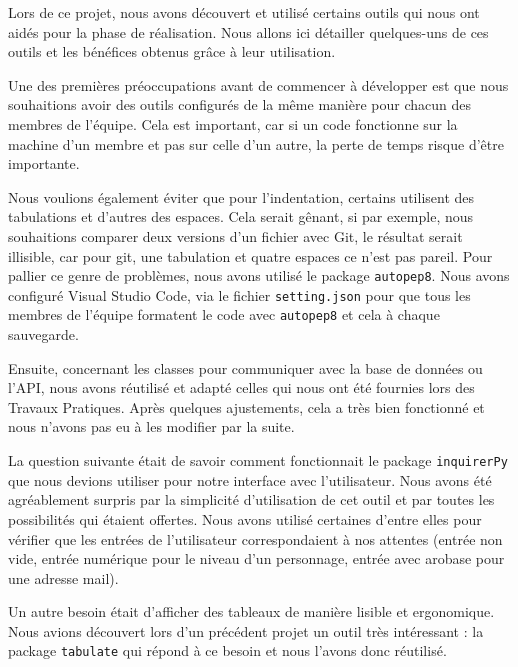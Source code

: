 \documentclass[11pt]{article}
\begin{document}
Lors de ce projet, nous avons découvert et utilisé certains outils qui nous ont aidés pour la phase de réalisation. Nous allons ici détailler quelques-uns de ces outils et les bénéfices obtenus grâce à leur utilisation.

\bigbreak

Une des premières préoccupations avant de commencer à développer est que nous souhaitions avoir des outils configurés de la même manière pour chacun des membres de l'équipe. Cela est important, car si un code fonctionne sur la machine d'un membre et pas sur celle d'un autre, la perte de temps risque d'être importante.


\bigbreak

Nous voulions également éviter que pour l'indentation, certains utilisent des tabulations et d'autres des espaces. Cela serait gênant, si par exemple, nous souhaitions comparer deux versions d'un fichier avec Git, le résultat serait illisible, car pour git, une tabulation et quatre espaces ce n'est pas pareil. Pour pallier ce genre de problèmes, nous avons utilisé le package \texttt{autopep8}. Nous avons configuré Visual Studio Code, via le fichier \texttt{setting.json} pour que tous les membres de l'équipe formatent le code avec \texttt{autopep8} et cela à chaque sauvegarde.

\bigbreak

Ensuite, concernant les classes pour communiquer avec la base de données ou l'API, nous avons réutilisé et adapté celles qui nous ont été fournies lors des Travaux Pratiques. Après quelques ajustements, cela a très bien fonctionné et nous n'avons pas eu à les modifier par la suite.

\bigbreak

La question suivante était de savoir comment fonctionnait le package \texttt{inquirerPy} que nous devions utiliser pour notre interface avec l'utilisateur. Nous avons été agréablement surpris par la simplicité d'utilisation de cet outil et par toutes les possibilités qui étaient offertes. Nous avons utilisé certaines d'entre elles pour vérifier que les entrées de l'utilisateur correspondaient à nos attentes (entrée non vide, entrée numérique pour le niveau d'un personnage, entrée avec arobase pour une adresse mail).

\bigbreak

Un autre besoin était d'afficher des tableaux de manière lisible et ergonomique. Nous avions découvert lors d'un précédent projet un outil très intéressant : la package \texttt{tabulate} qui répond à ce besoin et nous l'avons donc réutilisé.
\end{document}
